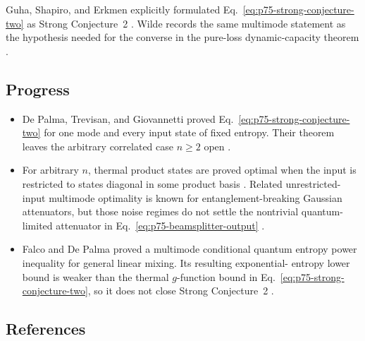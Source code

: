 Guha, Shapiro, and Erkmen explicitly formulated
Eq.~\eqref{eq:p75-strong-conjecture-two} as Strong Conjecture~2
.  Wilde records the same
multimode statement as the hypothesis needed for the converse in the
pure-loss dynamic-capacity theorem
.

\subsection*{Progress}

\begin{itemize}
  \item De Palma, Trevisan, and Giovannetti proved
  Eq.~\eqref{eq:p75-strong-conjecture-two} for one mode and every input state
  of fixed entropy.  Their theorem leaves the arbitrary correlated case
  $n\geq2$ open
  .

  \item For arbitrary $n$, thermal product states are proved optimal when the
  input is restricted to states diagonal in some product basis
  .  Related unrestricted-input
  multimode optimality is known for entanglement-breaking Gaussian
  attenuators, but those noise regimes do not settle the nontrivial
  quantum-limited attenuator in
  Eq.~\eqref{eq:p75-beamsplitter-output}
  .

  \item Falco and De Palma proved a multimode conditional quantum entropy
  power inequality for general linear mixing.  Its resulting exponential-
  entropy lower bound is weaker than the thermal $g$-function bound in
  Eq.~\eqref{eq:p75-strong-conjecture-two}, so it does not close Strong
  Conjecture~2
  .
\end{itemize}

\subsection*{References}

